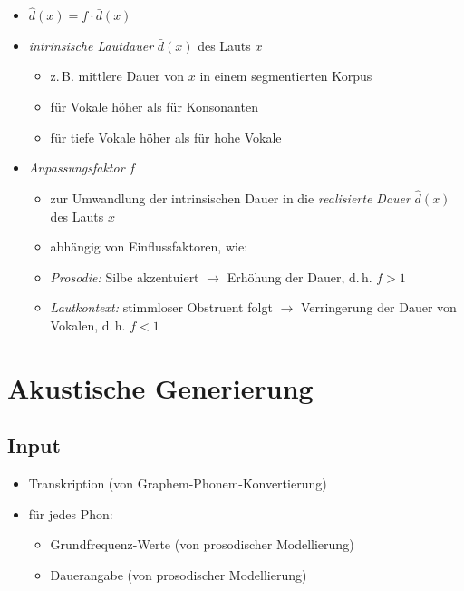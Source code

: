 \documentclass[11pt]{book}
\begin{document}
  \begin{itemize}
  \item $\hat{d}(x) = f \cdot \bar{d}(x)$
  \item \emph{intrinsische Lautdauer} $\bar{d}(x)$ des Lauts $x$
  \begin{itemize}
  \item z.\,B. mittlere Dauer von $x$ in einem segmentierten Korpus
  \item für Vokale höher als für Konsonanten
  \item für tiefe Vokale höher als für hohe Vokale
  \end{itemize}
  \item \emph{Anpassungsfaktor} $f$
  \begin{itemize}
  \item zur Umwandlung der intrinsischen Dauer in die \emph{realisierte Dauer} $\hat{d}(x)$ des Lauts $x$
  \item abhängig von Einflussfaktoren, wie:
  \item \emph{Prosodie:} Silbe akzentuiert $\longrightarrow$ Erhöhung der Dauer, d.\,h. $f>1$
  \item \emph{Lautkontext:} stimmloser Obstruent folgt $\longrightarrow$ Verringerung der Dauer von Vokalen, d.\,h. $f<1$
  \end{itemize}
  \end{itemize}

\newpage


  \section{Akustische Generierung}
  
  \subsection*{Input}

  \begin{itemize}
  \item Transkription (von Graphem-Phonem-Konvertierung)
  \item für jedes Phon:
  \begin{itemize}
  \item Grundfrequenz-Werte (von prosodischer Modellierung)
  \item Dauerangabe (von prosodischer Modellierung)
  \end{itemize}
  \end{itemize}
\end{document}
